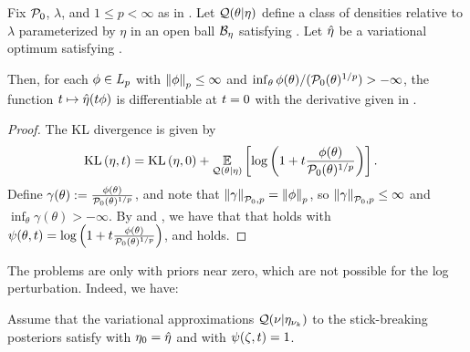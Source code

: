 \begin{thm}
%
Fix $\mathcal{P}_{0}$, $\lambda$, and $1 \le p < \infty$ as in .
Let $\mathcal{Q}(\theta \vert \eta)$ define a class of densities relative to $\lambda$
parameterized by $\eta$ in an open ball $\mathcal{B}_\eta$ satisfying
.  Let $\hat\eta$ be a variational optimum satisfying
.

Then, for each $\phi \in {L_{p}}$ with $\left\Vert\phi\right\Vert_p \le \infty$ and
$\inf_\theta \phi(\theta) / (\mathcal{P}_{0}(\theta)^{1/p})> -\infty$, the function $t
\mapsto \hat\eta(t \phi)$ is differentiable at $t = 0$ with the derivative
given in .
%
\begin{proof}
%
The KL divergence is given by
%
\begin{align*}
%
\KL{\eta, \t} ={}&
    \KL{\eta, 0} +
    \expect{\q(\theta \vert \eta)}
           {\log \left(1 + \t \frac{\phi(\theta)}{\pbase(\theta)^{1/p}} \right)}.
%
\end{align*}
%
Define $\gamma(\theta) := \frac{\phi(\theta)}{\mathcal{P}_{0}(\theta)^{1/p}}$, and note
that $\left\Vert\gamma\right\Vert_{\mathcal{P}_{0}, p} = \left\Vert\phi\right\Vert_{p}$, so $\left\Vert\gamma\right\Vert_{\mathcal{P}_{0},
p} \le \infty$ and $\inf_\theta \gamma(\theta) > -\infty$.  By
 and , we have that that
 holds with $\psi(\theta, t) = \log \left(1 + t
\frac{\phi(\theta)}{\mathcal{P}_{0}(\theta)^{1/p}}\right)$, and 
holds.
%
\end{proof}
%
\end{thm}


The problems are only with priors near zero, which are not possible for
the log perturbation.  Indeed, we have:


\begin{assu}
%
Assume that the variational approximations $\mathcal{Q}(\nu \vert \eta_{\nu_{k}})$ to the
stick-breaking posteriors satisfy  with $\eta_0 =
\hat\eta$ and with $\psi(\zeta, t) = 1$.
%
\end{assu}


